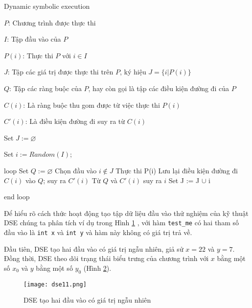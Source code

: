 \begin{algorithm}
	\caption{Dynamic symbolic execution}
	\label{alg:DSE}
	\begin{algorithmic}
		\item $ P $: Chương trình được thực thi		
		\item $ I $: Tập đầu vào của $ P $		
		\item $ P(i)$: Thực thi $ P $ với $ i \in I  $
		\item $ J $: Tập các giá trị được thực thi trên $ P $, ký hiệu $ J = \{i | P(i)\} $
		\item $ Q $: Tập các ràng buộc của $ P $, hay còn gọi là tập các điều kiện đường đi của $ P $
		\item $ C(i) $: Là ràng buộc thu gom được từ việc thực thi $ P(i)$
		\item $ C'(i) $: Là điều kiện đường đi suy ra từ $ C(i) $
        \item Set $J:= \varnothing $
        \item Set $i:= Random(I) $; 
        \item loop 
        	\subitem Set $ Q:= \varnothing $
        	\subitem Chọn đầu vào $ i \notin J $
          	\subitem Thực thi P(i) 
          	\subitem Lưu lại điều kiện đường đi $ C(i) $ vào $ Q $; suy ra $ C'(i)$ 
	        \subitem Từ $ Q $ và $ C'(i) $ suy ra $ i $
          	\subitem Set J := J $\cup $ i
        \item end loop
	\end{algorithmic}
\end{algorithm}

Để hiểu rõ cách thức hoạt động tạo tập dữ liệu đầu vào thử nghiệm của kỹ thuật DSE chúng ta phân tích ví dụ trong Hình \ref{lst:vddse} \cite{DSE}, với hàm \texttt{test\_me} có hai tham số đầu vào là \texttt{int x} và \texttt{int y} và hàm này không có giá trị trả về.

\begin{figure}[H]
	\centering
	\label{lst:vddse}
		
\end{figure}	

Đầu tiên, DSE tạo hai đầu vào có giá trị ngẫu nhiên, giả sử $x = 22$ và $y = 7$. Đồng thời, DSE theo dõi trạng thái biểu trưng của chương trình với $ x $ bằng một số $x_{0}$ và $ y $ bằng một số $y_{0}$ (Hình \ref{fig:dse11}).

\begin{figure}[H]	
	\begin{center}
		\texttt{[image: dse11.png]}
	\end{center}
	\caption{DSE tạo hai đầu vào có giá trị ngẫu nhiên}
	\label{fig:dse11}	
\end{figure}

